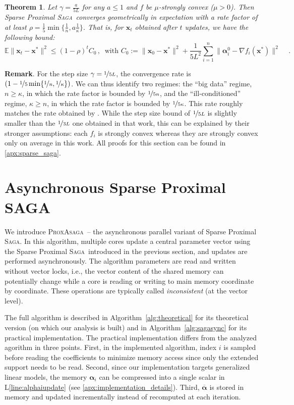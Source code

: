 \documentclass{article}
\def\EE{{\mathbb E}}
\newcommand{\PASAGA}{\textsc{ProxAsaga}}
\newcommand{\SAGA}{\textsc{Saga}}
\def\xx{{\boldsymbol x}}
\def\balpha{{\boldsymbol \alpha}}
\newtheorem{theorem}{Theorem}
\begin{document}
\begin{theorem}\label{theorem:rates_sparse_saga}
  \label{th1} Let $\gamma = \frac{a}{5L}$ for any $a\leq 1$ and $f$ be $\mu$-strongly convex ($\mu > 0$). Then Sparse Proximal \SAGA\ converges geometrically in expectation with a rate factor of at least $\rho = \frac{1}{5} \min\{\frac{1}{n}, a\frac{1}{\kappa}\}$. That is, for $\xx_t$ obtained after $t$ updates, we have the following bound:
  $$
  \EE \|\xx_t - \xx^*\|^2 \leq (1-\rho)^t C_0\,,~\text{ with }C_0 := \|\xx_0 - \xx^*\|^2 + \textstyle\frac{1}{5 L^2} \textstyle\sum_{i=1}^n\|{\boldsymbol\alpha}_i^0 - \nabla f_i(\xx^*)\|^2  \, \quad.
  $$
\end{theorem}
{\bfseries Remark}. For the step size $\gamma=\nicefrac{1}{5L}$, the convergence rate is $(1 - \nicefrac{1}{5}\min\{\nicefrac{1}{n}, \nicefrac{1}{\kappa}\})$.
We can thus identify two regimes: the ``big data'' regime, $n \geq \kappa$, in which the rate factor is bounded by $ \nicefrac{1}{5n}$, and the ``ill-conditioned'' regime, $\kappa \geq n$, in which the rate factor is bounded by $ \nicefrac{1}{5\kappa}$.
This rate roughly matches the rate obtained by \citet{defazio2014saga}.
While the step size bound of $\nicefrac{1}{5L}$ is slightly smaller than the $\nicefrac{1}{3L}$ one obtained in that work, this can be explained by their stronger assumptions: each $f_i$ is strongly convex whereas they are strongly convex only on average in this work. All proofs for this section can be found in \ref{apx:sparse_saga}.


\section{Asynchronous Sparse Proximal SAGA}\label{sec:pasaga}

We introduce \PASAGA\ -- the asynchronous parallel variant of Sparse Proximal \SAGA. In this algorithm, multiple cores update a central parameter vector using the Sparse Proximal \SAGA\ introduced in the previous section, and updates are performed asynchronously. The algorithm parameters are read and written without vector locks, i.e., the vector content of the shared memory can potentially change while a core is reading or writing to main memory coordinate by coordinate. These operations are typically called \emph{inconsistent} (at the vector level).



The full algorithm is described in
Algorithm~\ref{alg:theoretical} for its theoretical version (on which our analysis is built) and in Algorithm~\ref{alg:sagasync} for its practical implementation. The practical implementation differs from the analyzed agorithm in three points.
First, in the implemented algorithm, index $i$ is sampled before reading the coefficients to minimize memory access since only the extended support needs to be read. Second, since our implementation targets generalized linear models, the memory $\boldsymbol\alpha_i$ can be compressed into a single scalar in L\ref{line:alphaiupdate} (see \ref{apx:implementation_details}). Third, $\overline\balpha$ is stored in memory and updated incrementally instead of recomputed at each iteration. %
\end{document}
